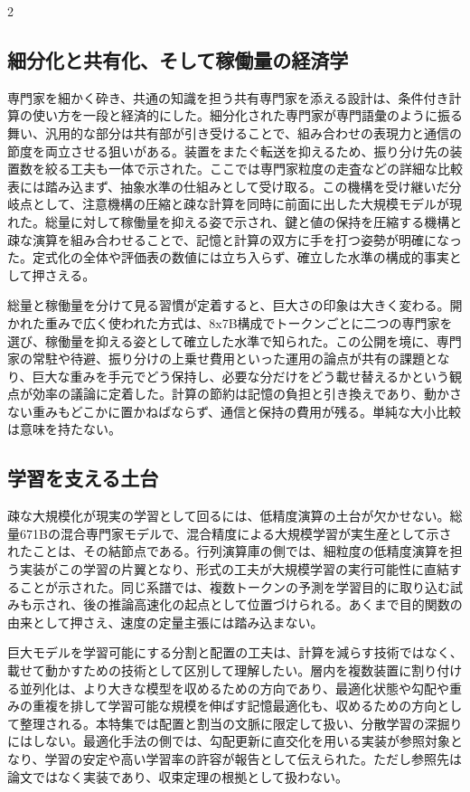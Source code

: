 \documentclass[lualatex,a4paper,10pt]{jlreq}
\begin{document}
\begin{multicols}{2}
\subsection{細分化と共有化、そして稼働量の経済学}
専門家を細かく砕き、共通の知識を担う共有専門家を添える設計は、条件付き計算の使い方を一段と経済的にした\autocite{deepseekmoe}。細分化された専門家が専門語彙のように振る舞い、汎用的な部分は共有部が引き受けることで、組み合わせの表現力と通信の節度を両立させる狙いがある。装置をまたぐ転送を抑えるため、振り分け先の装置数を絞る工夫も一体で示された。ここでは専門家粒度の走査などの詳細な比較表には踏み込まず、抽象水準の仕組みとして受け取る。この機構を受け継いだ分岐点として、注意機構の圧縮と疎な計算を同時に前面に出した大規模モデルが現れた\autocite{deepseekv2}。総量に対して稼働量を抑える姿で示され、鍵と値の保持を圧縮する機構と疎な演算を組み合わせることで、記憶と計算の双方に手を打つ姿勢が明確になった。定式化の全体や評価表の数値には立ち入らず、確立した水準の構成的事実として押さえる。

総量と稼働量を分けて見る習慣が定着すると、巨大さの印象は大きく変わる。開かれた重みで広く使われた方式は、8x7B構成でトークンごとに二つの専門家を選び、稼働量を抑える姿として確立した水準で知られた\autocite{mixtral}。この公開を境に、専門家の常駐や待避、振り分けの上乗せ費用といった運用の論点が共有の課題となり、巨大な重みを手元でどう保持し、必要な分だけをどう載せ替えるかという観点が効率の議論に定着した。計算の節約は記憶の負担と引き換えであり、動かさない重みもどこかに置かねばならず、通信と保持の費用が残る。単純な大小比較は意味を持たない。

\subsection{学習を支える土台}
疎な大規模化が現実の学習として回るには、低精度演算の土台が欠かせない。総量671Bの混合専門家モデルで、混合精度による大規模学習が実生産として示されたことは、その結節点である\autocite{deepseekv3}。行列演算庫の側では、細粒度の低精度演算を担う実装がこの学習の片翼となり、形式の工夫が大規模学習の実行可能性に直結することが示された\autocite{deepgemm}。同じ系譜では、複数トークンの予測を学習目的に取り込む試みも示され、後の推論高速化の起点として位置づけられる。あくまで目的関数の由来として押さえ、速度の定量主張には踏み込まない。

巨大モデルを学習可能にする分割と配置の工夫は、計算を減らす技術ではなく、載せて動かすための技術として区別して理解したい。層内を複数装置に割り付ける並列化は、より大きな模型を収めるための方向であり\autocite{megatron}、最適化状態や勾配や重みの重複を排して学習可能な規模を伸ばす記憶最適化も、収めるための方向として整理される\autocite{zero}。本特集では配置と割当の文脈に限定して扱い、分散学習の深掘りにはしない。最適化手法の側では、勾配更新に直交化を用いる実装が参照対象となり、学習の安定や高い学習率の許容が報告として伝えられた\autocite{muon}。ただし参照先は論文ではなく実装であり、収束定理の根拠として扱わない。


\end{multicols}
\end{document}
